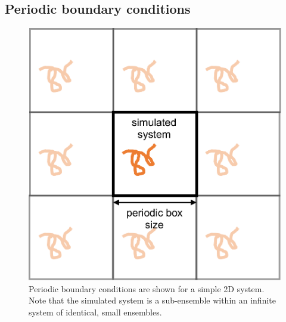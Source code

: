\documentclass[9pt,bestpractices]{livecoms}
\begin{document}
\subsection{Periodic boundary conditions}
\label{sec:periodic}

\begin{figure}[h]
\centering
\includegraphics[width=\linewidth]{PBC_figure.pdf}
\caption{Periodic boundary conditions are shown for a simple 2D system. Note that the simulated system is a sub-ensemble within an infinite system of identical, small ensembles.}
\label{pbcfig}
\end{figure}
\end{document}
